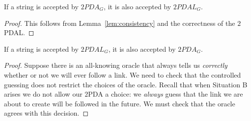 \begin{proposition} \label{prop:prop1}
If a string is accepted by $2PDA_G$, it is also accepted by $2PDAL_G$.
\end{proposition}

\begin{proof}
This follows from Lemma~\ref{lem:consistency} and the correctness of
the $2$PDAL.
\end{proof}

\begin{proposition} \label{prop:prop2}
If a string is accepted by $2PDAL_G$, it is also accepted by $2PDA_G$.
\end{proposition}

\begin{proof}
Suppose there is an all-knowing oracle that always tells us
\emph{correctly} whether or not we will ever follow a link. We need to
check that the controlled guessing does not restrict the choices of
the oracle.  Recall that when Situation B arises we do not allow our
$2$PDA a choice: we \emph{always} guess that the link we are about to
create will be followed in the future. We must check that the oracle
agrees with this decision.


\end{proof}
